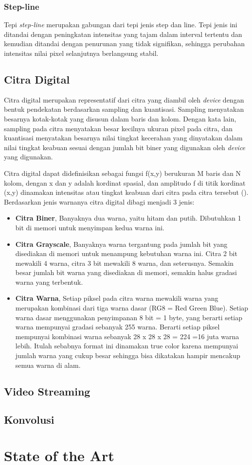\subsubsection{Step-line}
Tepi \textit{step-line} merupakan gabungan dari tepi jenis step dan line. Tepi jenis ini ditandai dengan peningkatan intensitas yang tajam dalam interval tertentu dan kemudian ditandai dengan penurunan yang tidak signifikan, sehingga perubahan intensitas nilai pixel selanjutnya berlangsung stabil.


\subsection{Citra Digital}
Citra digital merupakan representatif dari citra yang diambil oleh \textit{device} dengan bentuk pendekatan berdasarkan sampling dan kuantisasi. Sampling menyatakan besarnya kotak-kotak yang disusun dalam baris dan kolom. Dengan kata lain, sampling pada citra menyatakan besar kecilnya ukuran pixel pada citra, dan kuantisasi menyatakan besarnya nilai tingkat kecerahan yang dinyatakan dalam nilai tingkat keabuan sesuai dengan jumlah bit biner yang digunakan oleh \textit{device} yang digunakan. 

Citra digital dapat didefinisikan sebagai fungsi f(x,y) berukuran M baris dan N kolom, dengan x dan y adalah kordinat spasial, dan amplitudo f di titik kordinat (x,y) dinamakan intensitas atau tingkat keabuan dari citra pada citra tersebut (\cite{book:darma}). Berdasarkan jenis warnanya citra digital dibagi menjadi 3 jenis:

\begin{itemize}
    \item \textbf{Citra Biner}, Banyaknya dua warna, yaitu hitam dan putih. Dibutuhkan 1 bit di memori untuk menyimpan kedua warna ini.
    \item \textbf{Citra Grayscale}, Banyaknya warna tergantung pada jumlah bit yang disediakan di memori untuk menampung kebutuhan warna ini. Citra 2 bit mewakili 4 warna, citra 3 bit mewakili 8 warna, dan seterusnya. Semakin besar jumlah bit warna yang disediakan di memori, semakin halus gradasi warna yang terbentuk.
    \item \textbf{Citra Warna}, Setiap piksel pada citra warna mewakili warna yang merupakan kombinasi dari tiga warna dasar (RG8 = Red Green Blue). Setiap warna dasar menggunakan penyimpanan 8 bit = 1 byte, yang berarti setiap warna mempunyai gradasi sebanyak 255 warna. Berarti setiap piksel mempunyai kombinasi warna sebanyak 28 x 28 x 28 = 224 =16 juta warna lebih. Itulah sebabnya format ini dinamakan true color karena mempunyai jumlah warna yang cukup besar sehingga bisa dikatakan hampir mencakup semua warna di alam.
\end{itemize}

\subsection{Video Streaming}
\blindtext


\subsection{Konvolusi}
\blindtext


\section{State of the Art}
\blindtext

